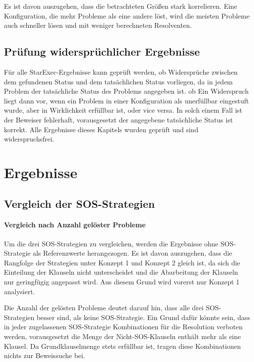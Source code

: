 	Es ist davon auszugehen, dass die betrachteten Größen stark korrelieren. Eine Konfiguration, die mehr Probleme als eine andere löst, wird die meisten Probleme auch schneller lösen und mit weniger berechneten Resolventen.
	
	\subsection{Prüfung widersprüchlicher Ergebnisse}
		Für alle StarExec-Ergebnisse kann geprüft werden, ob Widersprüche zwischen dem gefundenen Status und dem tatsächlichen Status vorliegen, da in jedem Problem der tatsächliche Status des Problems angegeben ist. ob  Ein Widerspruch liegt dann vor, wenn ein Problem in einer Konfiguration als unerfüllbar eingestuft wurde, aber in Wirklichkeit erfüllbar ist, oder vice versa. In solch einem Fall ist der Beweiser fehlerhaft, vorausgesetzt der angegebene tatsächliche Status ist korrekt. Alle Ergebnisse dieses Kapitels wurden geprüft und sind widerspruchsfrei.

\section{Ergebnisse}
	\subsection{Vergleich der SOS-Strategien}
		\paragraph{Vergleich nach Anzahl gelöster Probleme}
		
	 	Um die drei SOS-Strategien zu vergleichen, werden die Ergebnisse ohne SOS-Strategie als Referenzwerte herangezogen.
	 	Es ist davon auszugehen, dass die Rangfolge der Strategien unter Konzept 1 und Konzept 2 gleich ist, da sich die Einteilung der Klauseln nicht unterscheidet und die Abarbeitung der Klauseln nur geringfügig angepasst wird. Aus diesem Grund wird vorerst nur Konzept 1 analysiert.
	 	
	 	Die Anzahl der gelösten Probleme deutet darauf hin, dass alle drei SOS-Strategien besser sind, als keine SOS-Strategie. 
	 	Ein Grund dafür könnte sein, dass in jeder zugelassenen SOS-Strategie Kombinationen für die Resolution verboten werden, vorausgesetzt die Menge der Nicht-SOS-Klauseln enthält mehr als eine Klausel. Da Grundklauselmenge stets erfüllbar ist, tragen diese Kombinationen nichts zur Beweissuche bei.
	 	
